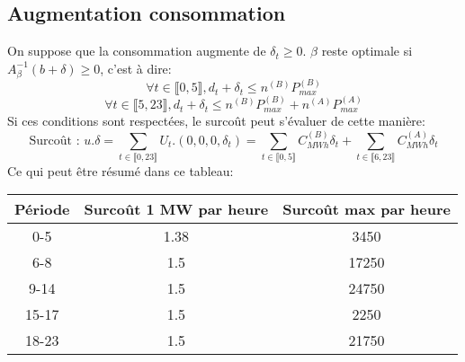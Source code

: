 \documentclass{article}
\begin{document}
\subsection{Augmentation consommation}
On suppose que la consommation augmente de $\delta_t\geq0$. $\beta$ reste optimale si $A^{-1}_{\beta}(b+\delta)\geq 0$, c'est à dire:\\
$$
\forall t \in \llbracket 0,5 \rrbracket, d_t+\delta_t \leq n^{(B)}P_{max}^{(B)}
$$
$$
\forall t \in \llbracket 5,23 \rrbracket, d_t+\delta_t \leq n^{(B)}P_{max}^{(B)} +n^{(A)}P_{max}^{(A)}
$$
Si ces conditions sont respectées, le surcoût peut s'évaluer de cette manière:
$$
\text{Surcoût : }u.\delta = \sum_{t\in\llbracket 0,23 \rrbracket} U_t. (0, 0, 0, \delta_t) = \sum_{t\in\llbracket 0,5 \rrbracket} C_{MWh}^{(B)} \delta_t + \sum_{t\in\llbracket 6,23 \rrbracket} C_{MWh}^{(A)} \delta_t
$$
Ce qui peut être résumé dans ce tableau:
\begin{center}
    \begin{tabular}{|c|c|c|}
        \hline
        \bf Période & \bf Surcoût 1 MW par heure & \bf Surcoût max par heure \\
        \hline 
        0-5 & 1.38 & 3450 \\
        6-8 & 1.5 & 17250 \\
        9-14 & 1.5 & 24750 \\
        15-17 &1.5 & 2250 \\
        18-23 & 1.5 & 21750\\
    \hline
    \end{tabular}
\end{center}
\end{document}
